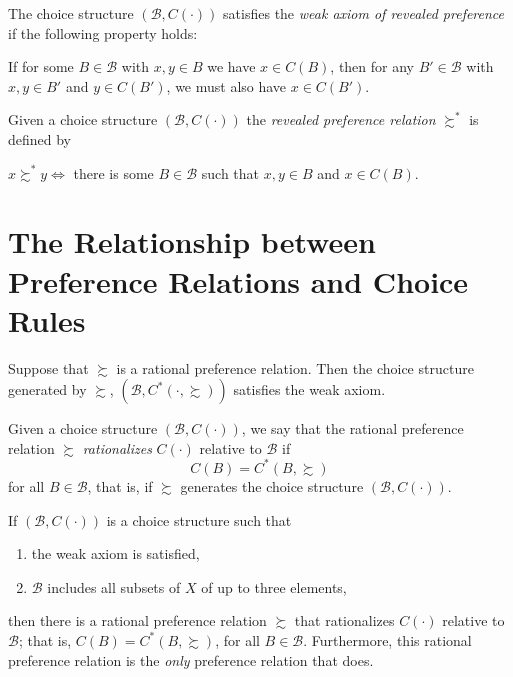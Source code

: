 \begin{defn}
    The choice structure $(\mathscr{B}, C(\cdot))$ satisfies the \emph{weak axiom of revealed preference} if the following property holds:

    If for some $B \in \mathscr{B}$ with $x, y \in B$ we have $x \in C(B)$, then for any $B' \in \mathscr{B}$ with $x, y \in B'$ and $y \in C(B')$, we must also have $x \in C(B')$.
\end{defn}

\begin{defn}
    Given a choice structure $(\mathscr{B}, C(\cdot))$ the \emph{revealed preference relation} $\succsim^*$ is defined by 

    $x \succsim^* y \iff$ there is some $B \in \mathscr{B}$ such that $x, y \in B$ and $x \in C(B)$.
\end{defn}

\section{The Relationship between Preference Relations and Choice Rules}

\begin{prop}
    Suppose that $\succsim$ is a rational preference relation. Then the choice structure generated by $\succsim$, $(\mathscr{B}, C^*(\cdot, \succsim))$ satisfies the weak axiom.
\end{prop}

\begin{defn}
    Given a choice structure $(\mathscr{B}, C(\cdot))$, we say that the rational preference relation $\succsim$ \emph{rationalizes} $C(\cdot)$ relative to $\mathscr{B}$ if
    \begin{equation*}
        C(B) = C^*(B, \succsim)
    \end{equation*}
    for all $B \in \mathscr{B}$, that is, if $\succsim$ generates the choice structure $(\mathscr{B}, C(\cdot))$.
\end{defn}

\begin{prop}
    If $(\mathscr{B}, C(\cdot))$ is a choice structure such that
    \begin{enumerate}
        \item the weak axiom is satisfied,
        \item $\mathscr{B}$ includes all subsets of $X$ of up to three elements,
    \end{enumerate}
    then there is a rational preference relation $\succsim$ that rationalizes $C(\cdot)$ relative to $\mathscr{B}$; that is, $C(B) = C^*(B, \succsim)$, for all $B \in \mathscr{B}$. Furthermore, this rational preference relation is the \emph{only} preference relation that does.
\end{prop}
